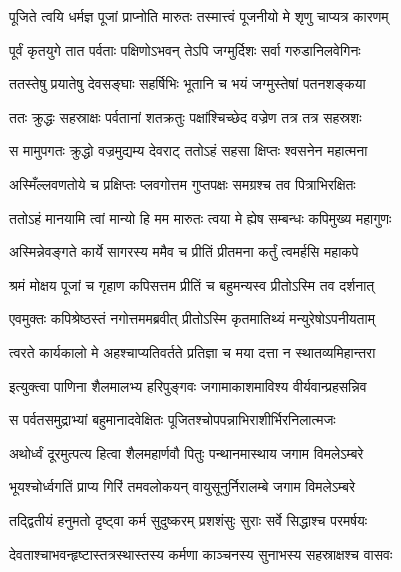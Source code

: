 \twolineshloka
{पूजिते त्वयि धर्मज्ञ पूजां प्राप्नोति मारुतः}
{तस्मात्त्वं पूजनीयो मे शृणु चाप्यत्र कारणम्} %

\twolineshloka
{पूर्वं कृतयुगे तात पर्वताः पक्षिणोऽभवन्}
{तेऽपि जग्मुर्दिशः सर्वा गरुडानिलवेगिनः} %

\twolineshloka
{ततस्तेषु प्रयातेषु देवसङ्घाः सहर्षिभिः}
{भूतानि च भयं जग्मुस्तेषां पतनशङ्कया} %

\twolineshloka
{ततः क्रुद्धः सहस्राक्षः पर्वतानां शतक्रतुः}
{पक्षांश्चिच्छेद वज्रेण तत्र तत्र सहस्रशः} %

\twolineshloka
{स मामुपगतः क्रुद्धो वज्रमुद्यम्य देवराट्}
{ततोऽहं सहसा क्षिप्तः श्वसनेन महात्मना} %

\twolineshloka
{अस्मिँल्लवणतोये च प्रक्षिप्तः प्लवगोत्तम}
{गुप्तपक्षः समग्रश्च तव पित्राभिरक्षितः} %

\twolineshloka
{ततोऽहं मानयामि त्वां मान्यो हि मम मारुतः}
{त्वया मे ह्येष सम्बन्धः कपिमुख्य महागुणः} %

\twolineshloka
{अस्मिन्नेवङ्गते कार्ये सागरस्य ममैव च}
{प्रीतिं प्रीतमना कर्तुं त्वमर्हसि महाकपे} %

\twolineshloka
{श्रमं मोक्षय पूजां च गृहाण कपिसत्तम}
{प्रीतिं च बहुमन्यस्व प्रीतोऽस्मि तव दर्शनात्} %

\twolineshloka
{एवमुक्तः कपिश्रेष्ठस्तं नगोत्तममब्रवीत्}
{प्रीतोऽस्मि कृतमातिथ्यं मन्युरेषोऽपनीयताम्} %

\twolineshloka
{त्वरते कार्यकालो मे अहश्चाप्यतिवर्तते}
{प्रतिज्ञा च मया दत्ता न स्थातव्यमिहान्तरा} %

\twolineshloka
{इत्युक्त्वा पाणिना शैलमालभ्य हरिपुङ्गवः}
{जगामाकाशमाविश्य वीर्यवान्प्रहसन्निव} %

\twolineshloka
{स पर्वतसमुद्राभ्यां बहुमानादवेक्षितः}
{पूजितश्चोपपन्नाभिराशीर्भिरनिलात्मजः} %

\twolineshloka
{अथोर्ध्वं दूरमुत्पत्य हित्वा शैलमहार्णवौ}
{पितुः पन्थानमास्थाय जगाम विमलेऽम्बरे} %

\twolineshloka
{भूयश्चोर्ध्वगतिं प्राप्य गिरिं तमवलोकयन्}
{वायुसूनुर्निरालम्बे जगाम विमलेऽम्बरे} %

\twolineshloka
{तद्द्वितीयं हनुमतो दृष्ट्वा कर्म सुदुष्करम्}
{प्रशशंसुः सुराः सर्वे सिद्धाश्च परमर्षयः} %

\twolineshloka
{देवताश्चाभवन्हृष्टास्तत्रस्थास्तस्य कर्मणा}
{काञ्चनस्य सुनाभस्य सहस्राक्षश्च वासवः} %

